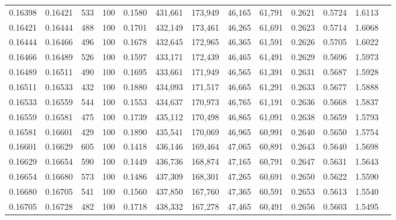 \begin{tabular}{rrrrrrrrrrrrr}
0.16398 & 0.16421 &   533 & 100 &                                     0.1580 & 431,661 & 173,949 &  46,165 &  61,791 & 0.2621 & 0.5724 & 1.6113 \\
0.16421 & 0.16444 &   488 & 100 &                                     0.1701 & 432,149 & 173,461 &  46,265 &  61,691 & 0.2623 & 0.5714 & 1.6068 \\
0.16444 & 0.16466 &   496 & 100 &                                     0.1678 & 432,645 & 172,965 &  46,365 &  61,591 & 0.2626 & 0.5705 & 1.6022 \\
0.16466 & 0.16489 &   526 & 100 &                                     0.1597 & 433,171 & 172,439 &  46,465 &  61,491 & 0.2629 & 0.5696 & 1.5973 \\
0.16489 & 0.16511 &   490 & 100 &                                     0.1695 & 433,661 & 171,949 &  46,565 &  61,391 & 0.2631 & 0.5687 & 1.5928 \\
0.16511 & 0.16533 &   432 & 100 &                                     0.1880 & 434,093 & 171,517 &  46,665 &  61,291 & 0.2633 & 0.5677 & 1.5888 \\
0.16533 & 0.16559 &   544 & 100 &                                     0.1553 & 434,637 & 170,973 &  46,765 &  61,191 & 0.2636 & 0.5668 & 1.5837 \\
0.16559 & 0.16581 &   475 & 100 &                                     0.1739 & 435,112 & 170,498 &  46,865 &  61,091 & 0.2638 & 0.5659 & 1.5793 \\
0.16581 & 0.16601 &   429 & 100 &                                     0.1890 & 435,541 & 170,069 &  46,965 &  60,991 & 0.2640 & 0.5650 & 1.5754 \\
0.16601 & 0.16629 &   605 & 100 &                                     0.1418 & 436,146 & 169,464 &  47,065 &  60,891 & 0.2643 & 0.5640 & 1.5698 \\
0.16629 & 0.16654 &   590 & 100 &                                     0.1449 & 436,736 & 168,874 &  47,165 &  60,791 & 0.2647 & 0.5631 & 1.5643 \\
0.16654 & 0.16680 &   573 & 100 &                                     0.1486 & 437,309 & 168,301 &  47,265 &  60,691 & 0.2650 & 0.5622 & 1.5590 \\
0.16680 & 0.16705 &   541 & 100 &                                     0.1560 & 437,850 & 167,760 &  47,365 &  60,591 & 0.2653 & 0.5613 & 1.5540 \\
0.16705 & 0.16728 &   482 & 100 &                                     0.1718 & 438,332 & 167,278 &  47,465 &  60,491 & 0.2656 & 0.5603 & 1.5495 \\

\end{tabular}
